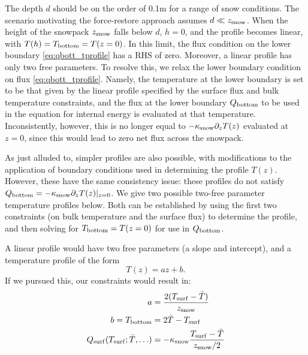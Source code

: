 \documentclass[twoside,10pt]{report}
\begin{document}
The depth $d$ should be on the order of 0.1m \citep{Dickinson88} for a range of snow conditions. The scenario motivating the force-restore approach assumes $d\ll z_{\rm snow}$. When the height of the snowpack $z_{\rm snow}$ falls below $d$, $h=0$, and the profile becomes linear, with $T(h) = T_{\rm bottom} = T(z=0)$. In this limit, the flux condition on the lower boundary \eqref{eq:qbott_tprofile} has a RHS of zero. Moreover, a linear profile has only two free parameters. To resolve this, we relax the lower boundary condition on flux \eqref{eq:qbott_tprofile}. Namely, the temperature at the lower boundary is set to be that given by the linear profile specified by the surface flux and bulk temperature constraints, and the flux at the lower boundary $Q_{\rm bottom}$ to be used in the equation for internal energy is evaluated at that temperature. Inconsistently, however, this is no longer equal to $-\kappa_{\rm snow}  \partial_z T(z)$ evaluated at $z=0$, since this would lead to zero net flux across the snowpack. 

As just alluded to, simpler profiles are also possible, with modifications to the application of boundary conditions used in determining the profile $T(z)$. However, these have the same consistency issue: these profiles do not satisfy $Q_{\rm bottom} = -\kappa_{\rm snow}  \partial_z T(z)|_{z = 0}$. We give two possible two-free parameter temperature profiles below. Both can be established by using the first two constraints (on bulk temperature and the surface flux) to determine the profile, and then solving for  $T_{\rm bottom} = T(z=0)$ for use in $Q_{\rm bottom}$. 


A linear profile \citep{Semtner76a} would have two free parameters (a slope and intercept), and a temperature profile of the form
\begin{equation}\label{eq:linear}
        T(z) = a z+b.
\end{equation}
If we pursued this, our constraints would result in:
\begin{align}
a &= \frac{2(T_{\rm surf} - \bar{T})}{z_{\rm snow}} \\
b  = T_{\rm bottom} & = 2\bar{T}- T_{\rm surf} \\
Q_{\rm surf }(T_{\rm surf}; \bar{T}, \ldots) &=-\kappa_{\rm snow} \frac{T_{\rm surf}- \bar{T}}{z_{\rm snow}/2}
\end{align}
\end{document}
